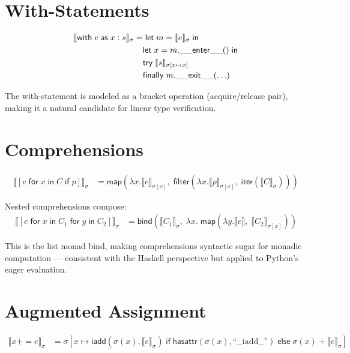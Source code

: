 \documentclass[11pt,a4paper]{report}
\theoremstyle{definition}
\theoremstyle{plain}
\newcommand{\den}[1]{\llbracket #1 \rrbracket}
\begin{document}
\section{With-Statements}

\begin{align}
  \den{\mathsf{with}\;e\;\mathsf{as}\;x: s}_\sigma
    &= \mathsf{let}\; m = \den{e}_\sigma \;\mathsf{in} \notag\\
    &\phantom{=}\; \mathsf{let}\; x = m.\mathsf{\_\_enter\_\_}() \;\mathsf{in} \notag\\
    &\phantom{=}\; \mathsf{try}\;\den{s}_{\sigma[x \mapsto x]} \notag\\
    &\phantom{=}\; \mathsf{finally}\; m.\mathsf{\_\_exit\_\_}(\ldots)
\end{align}

The with-statement is modeled as a bracket operation (acquire/release pair),
making it a natural candidate for linear type verification.

\section{Comprehensions}

\begin{align}
  \den{[e\;\mathsf{for}\;x\;\mathsf{in}\;C\;\mathsf{if}\;p]}_\sigma
    &= \mathsf{map}\!\left(\lambda x.\den{e}_{\sigma[x]},\;
       \mathsf{filter}\!\left(\lambda x.\den{p}_{\sigma[x]},\;
       \mathsf{iter}(\den{C}_\sigma)\right)\right)
\end{align}

Nested comprehensions compose:
\begin{align}
  \den{[e\;\mathsf{for}\;x\;\mathsf{in}\;C_1\;\mathsf{for}\;y\;\mathsf{in}\;C_2]}_\sigma
    &= \mathsf{bind}\!\left(\den{C_1}_\sigma,\;
       \lambda x.\;\mathsf{map}\!\left(\lambda y.\den{e},\;
       \den{C_2}_{\sigma[x]}\right)\right)
\end{align}

This is the list monad bind, making comprehensions syntactic sugar for monadic
computation --- consistent with the Haskell perspective but applied to Python's
eager evaluation.

\section{Augmented Assignment}

\begin{align}
  \den{x \mathbin{+}= e}_\sigma
    &= \sigma\!\left[x \mapsto
       \mathsf{iadd}(\sigma(x), \den{e}_\sigma) \;\mathsf{if}\;
       \mathsf{hasattr}(\sigma(x), \text{``\_\_iadd\_\_''})
       \;\mathsf{else}\;
       \sigma(x) + \den{e}_\sigma\right]
\end{align}
\end{document}
